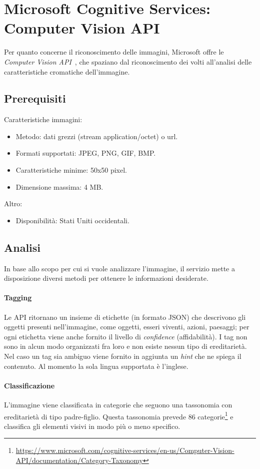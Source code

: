 \section{Microsoft Cognitive Services: Computer Vision API}
Per quanto concerne il riconoscimento delle immagini, Microsoft offre le \textit{Computer Vision API} \cite{microsoft-api}, che spaziano dal riconoscimento dei volti all'analisi delle caratteristiche cromatiche dell'immagine.

\subsection{Prerequisiti}
Caratteristiche immagini:
\begin{itemize}
\item Metodo: dati grezzi (stream application/octet) o url.
\item Formati supportati: JPEG, PNG, GIF, BMP.
\item Caratteristiche minime: 50x50 pixel. 
\item Dimensione massima: 4 MB.
\end{itemize}
Altro:
\begin{itemize}
\item Disponibilità: Stati Uniti occidentali.
\end{itemize}


\subsection{Analisi}
In base allo scopo per cui si vuole analizzare l'immagine, il servizio mette a disposizione diversi metodi per ottenere le informazioni desiderate.

\paragraph{Tagging} Le API ritornano un insieme di etichette (in formato JSON) che descrivono gli oggetti presenti nell'immagine, come oggetti, esseri viventi, azioni, paesaggi; per ogni etichetta viene anche fornito il livello di \textit{confidence} (affidabilità). I tag non sono in alcun modo organizzati fra loro e non esiste nessun tipo di ereditarietà.
Nel caso un tag sia ambiguo viene fornito in aggiunta un \textit{hint} che ne spiega il contenuto.
Al momento la sola lingua supportata è l'inglese.

\paragraph{Classificazione} L'immagine viene classificata in categorie che seguono una tassonomia con ereditarietà di tipo padre-figlio. Questa tassonomia prevede 86 categorie\footnote{\url{https://www.microsoft.com/cognitive-services/en-us/Computer-Vision-API/documentation/Category-Taxonomy}} e classifica gli elementi visivi in modo più o meno specifico.

